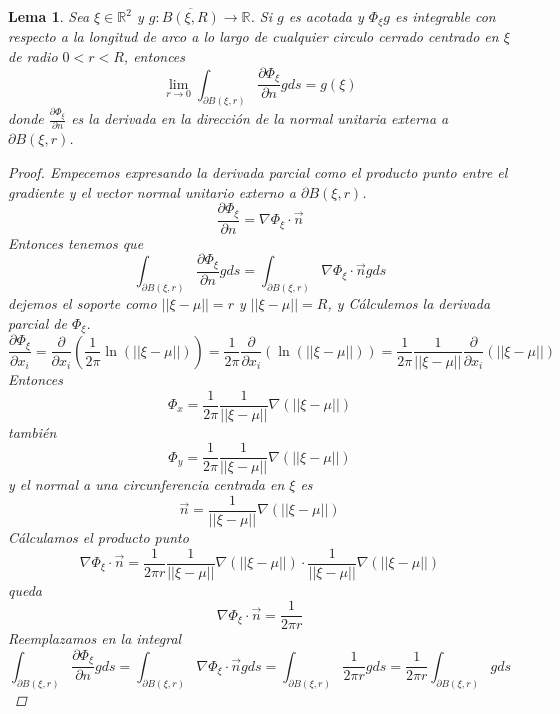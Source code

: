 \documentclass[11pt]{book}
\theoremstyle{plain}
\newtheorem{lema}[proposición]{Lema}
\theoremstyle{definition}
\newcommand{\R}{\mathbb{R}}
\begin{document}
    \begin{lema}
        Sea $\xi \in \R^{2}$ y $g : \overline{B(\xi,R)} \to \R$. Si $g$ es acotada y $\Phi_{\xi}g$ es integrable con respecto a la longitud de arco a lo largo de cualquier circulo cerrado centrado en $\xi$ de radio $0 < r < R$, entonces
        \[
            \lim_{r \to 0} \int_{\partial B(\xi,r)} \frac{\partial \Phi_{\xi}}{\partial n}g ds = g(\xi)
        \]
        donde $\frac{\partial \Phi_{\xi}}{\partial n}$ es la derivada en la dirección de la normal unitaria externa a $\partial B(\xi,r)$.
        
        \begin{proof}
            Empecemos expresando la derivada parcial como el producto punto entre el gradiente y el vector normal unitario externo a $\partial B(\xi,r)$.
            \[
                \frac{\partial \Phi_{\xi}}{\partial n} = \nabla \Phi_{\xi} \cdot \overrightarrow{n}
            \]
            Entonces tenemos que
            \[
                \int_{\partial B(\xi,r)} \frac{\partial \Phi_{\xi}}{\partial n}g ds = \int_{\partial B(\xi,r)} \nabla \Phi_{\xi} \cdot \overrightarrow{n} g ds
            \]
            dejemos el soporte como $||\xi - \mu|| = r$ y $||\xi - \mu|| = R$, y Cálculemos la derivada parcial de $\Phi_{\xi}$.
            \[
                \frac{\partial \Phi_{\xi}}{\partial x_{i}} = \frac{\partial}{\partial x_{i}}\left(\frac{1}{2\pi}\ln(||\xi - \mu||)\right) = \frac{1}{2\pi}\frac{\partial}{\partial x_{i}}\left(\ln(||\xi - \mu||)\right) = \frac{1}{2\pi}\frac{1}{||\xi - \mu||}\frac{\partial}{\partial x_{i}}(||\xi - \mu||)
            \]
            Entonces
            \[
                \Phi_{x} = \frac{1}{2\pi}\frac{1}{||\xi - \mu||}\nabla(||\xi - \mu||)
            \]
            también
            \[
                \Phi_{y} = \frac{1}{2\pi}\frac{1}{||\xi - \mu||}\nabla(||\xi - \mu||)
            \]
            y el normal a una circunferencia centrada en $\xi$ es
            \[
                \overrightarrow{n} = \frac{1}{||\xi - \mu||}\nabla(||\xi - \mu||)
            \]
            Cálculamos el producto punto
            \[
                \nabla \Phi_{\xi} \cdot \overrightarrow{n} = \frac{1}{2\pi r}\frac{1}{||\xi - \mu||}\nabla(||\xi - \mu||) \cdot \frac{1}{||\xi - \mu||}\nabla(||\xi - \mu||)
            \]
            queda
            \[
                \nabla \Phi_{\xi} \cdot \overrightarrow{n} = \frac{1}{2\pi r}
            \]
            Reemplazamos en la integral
            \[
                \int_{\partial B(\xi,r)} \frac{\partial \Phi_{\xi}}{\partial n}g ds = \int_{\partial B(\xi,r)} \nabla \Phi_{\xi} \cdot \overrightarrow{n} g ds = \int_{\partial B(\xi,r)} \frac{1}{2\pi r} g ds = \frac{1}{2\pi r} \int_{\partial B(\xi,r)} g ds
\]
\end{proof}
\end{lema}
\end{document}
